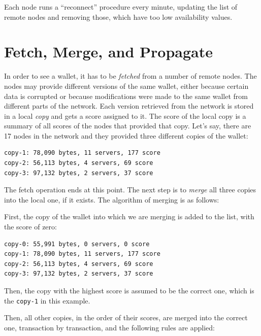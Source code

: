 \documentclass[11pt,oneside]{article}
\newcommand\dd[1]{\colorbox{gray!30}{\texttt{#1}}}
\begin{document}
Each node runs a ``reconnect'' procedure every minute, updating the list
of remote nodes and removing those, which have too low availability values.

\section{Fetch, Merge, and Propagate}\label{sec:fetch}

In order to see a wallet, it has to be \emph{fetched} from a number of remote
nodes. The nodes may provide different versions of the same wallet, either
because certain data is corrupted or because modifications were made to the same
wallet from different parts of the network. Each version retrieved from the
network is stored in a local \emph{copy} and gets a score assigned to it.
The score of the local copy is a summary of all scores of the nodes that
provided that copy. Let's say, there are 17 nodes in the network and they
provided three different copies of the wallet:

\begin{verbatim}
copy-1: 78,090 bytes, 11 servers, 177 score
copy-2: 56,113 bytes, 4 servers, 69 score
copy-3: 97,132 bytes, 2 servers, 37 score
\end{verbatim}

The fetch operation ends at this point. The next step is to \emph{merge}
all three copies into the local one, if it exists. The algorithm of merging
is as follows:

First, the copy of the wallet into which we are merging is added to the list,
with the score of zero:

\begin{verbatim}
copy-0: 55,991 bytes, 0 servers, 0 score
copy-1: 78,090 bytes, 11 servers, 177 score
copy-2: 56,113 bytes, 4 servers, 69 score
copy-3: 97,132 bytes, 2 servers, 37 score
\end{verbatim}

Then, the copy with the highest score is assumed to be the correct one,
which is the \dd{copy-1} in this example.

Then, all other copies, in the order of their scores, are merged into the
correct one, transaction by transaction, and the following rules are applied:
\end{document}
